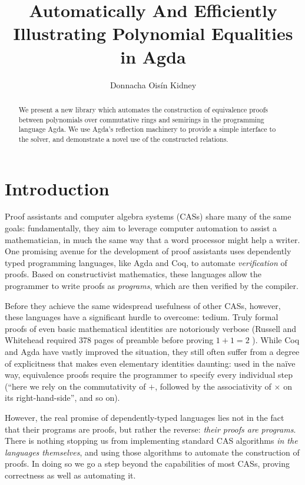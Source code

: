 \documentclass[draft, twocolumn]{article}
\author{Donnacha Oisín Kidney}
\title{Automatically And Efficiently Illustrating Polynomial Equalities in Agda}
\theoremstyle{definition}
\theoremstyle{definition}
\begin{document}
\maketitle
\begin{abstract}
  We present a new library which automates the construction of equivalence
  proofs between polynomials over commutative rings and semirings in the
  programming language Agda\cite{norell_dependently_2008}. We use Agda's
  reflection machinery to provide a simple interface to the solver, and
  demonstrate a novel use of the constructed relations.
\end{abstract}
\tableofcontents
\section{Introduction}
Proof assistants and computer algebra systems (CASs) share many of the same
goals: fundamentally, they aim to leverage computer automation to assist a
mathematician, in much the same way that a word processor might help a writer.
One promising avenue for the development of proof assistants uses dependently
typed programming languages, like Agda\cite{norell_dependently_2008} and
Coq\cite{the_coq_development_team_2018_1219885}, to automate \emph{verification}
of proofs. Based on constructivist mathematics, these languages allow the
programmer to write proofs as \emph{programs}, which are then verified by the
compiler.

Before they achieve the same widespread usefulness of other CASs, however, these
languages have a significant hurdle to overcome: tedium. Truly formal proofs of
even basic mathematical identities are notoriously verbose (Russell and
Whitehead required 378 pages of preamble before proving \(1+1=2\)
\cite{whitehead_principia_1910}). While Coq and Agda have vastly improved the
situation, they still often suffer from a degree of explicitness that makes even
elementary identities daunting: used in the naïve way, equivalence proofs
require the programmer to specify every individual step (``here we rely on the
commutativity of \(+\), followed by the associativity of \(\times\) on its
right-hand-side'', and so on).

However, the real promise of dependently-typed languages lies not in the fact
that their programs are proofs, but rather the reverse: \emph{their proofs are
  programs}. There is nothing stopping us from implementing standard CAS
algorithms \emph{in the languages themselves}, and using those algorithms to
automate the construction of proofs. In doing so we go a step beyond the
capabilities of most CASs, proving correctness as well as automating it.
\end{document}
